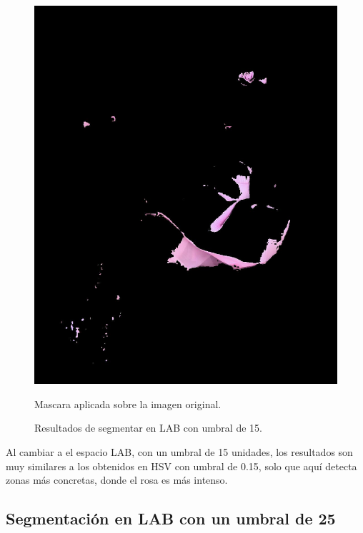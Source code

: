 \documentclass[11pt, letterpaper]{article}
\begin{document}
\begin{figure}[h!]
\begin{minipage}{0.4\textwidth}
		\includegraphics[width=\textwidth]{IMG/R33.jpg}
		\caption*{Mascara aplicada sobre la imagen original.}
	\end{minipage}
	\caption{Resultados de segmentar en LAB con umbral de 15.}
	\label{fig:f4}
\end{figure}

Al cambiar a el espacio LAB, con un umbral de 15 unidades, los resultados son muy  similares a los obtenidos en HSV con umbral de 0.15, solo que aquí detecta zonas más concretas, donde el rosa es más intenso.

\newpage

\subsection{Segmentación en LAB con un umbral de 25}
\end{document}
